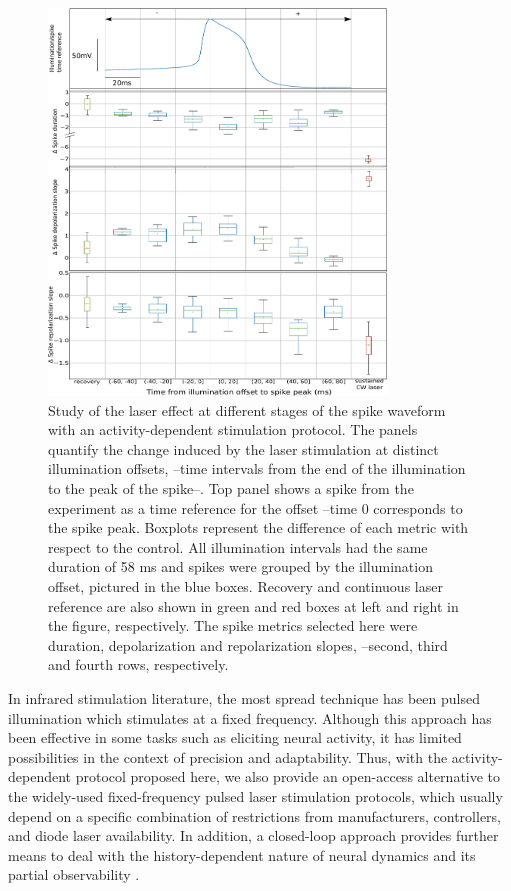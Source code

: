 \begin{figure}[htb!]
    \centering
    \includegraphics[width=0.8\textwidth]{img/laser/activity_dependent_mean_boxplot_nocreative.pdf}
    \caption{Study of the laser effect at different stages of the spike waveform with an activity-dependent stimulation protocol. The panels quantify the change induced by the laser stimulation at distinct illumination offsets, --time intervals from the end of the illumination to the peak of the spike--. Top panel shows a spike from the experiment as a time reference for the offset --time 0 corresponds to the spike peak. Boxplots represent the difference of each metric with respect to the control. All illumination intervals had the same duration of 58 ms and spikes were grouped by the illumination offset, pictured in the blue boxes. Recovery and continuous laser reference are also shown in green and red boxes at left and right in the figure, respectively. The spike metrics selected here were duration, depolarization and repolarization slopes, --second, third and fourth rows, respectively.}
    \label{fig:activity dependent}
\end{figure}

In infrared stimulation literature, the most spread technique has been pulsed illumination which stimulates at a fixed frequency. Although this approach has been effective in some tasks such as eliciting neural activity, it has limited possibilities in the context of precision and adaptability. Thus, with the activity-dependent protocol proposed here, we also provide an open-access alternative to the widely-used fixed-frequency pulsed laser stimulation protocols, which usually depend on a specific combination of restrictions from manufacturers, controllers, and diode laser availability. In addition, a closed-loop approach provides further means to deal with the history-dependent nature of neural dynamics and its partial observability \cite{Varona2016a}. 


